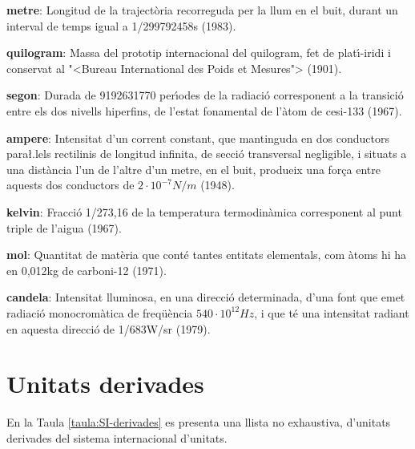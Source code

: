 \begin{list}{}
   {\setlength{\labelwidth}{22mm} \setlength{\leftmargin}{22mm} \setlength{\labelsep}{2mm}}
   \item[\textbf{metre}:] Longitud de la traject\`{o}ria recorreguda per la llum
   en el buit, durant un interval de temps igual a 1/299792458\unit{s} (1983).
   \item[\textbf{quilogram}:] Massa del prototip internacional del quilogram, fet de plat\'{\i}-iridi i
    conservat al {"<}Bureau International des Poids et Mesures{">} (1901).
   \item[\textbf{segon}:] Durada de 9192631770 per\'{\i}odes de la
   radiaci\'{o} corresponent a la transici\'{o} entre els dos nivells
  hiperfins, de l'estat fonamental de l'\`{a}tom de cesi-133 (1967).
   \item[\textbf{ampere}:] Intensitat d'un corrent constant,
   que mantinguda en dos conductors para{\l.l}els rectilinis de longitud
   infinita, de secci\'{o} transversal negligible, i situats a una
   dist\`{a}ncia l'un de l'altre d'un metre, en el buit, produeix una for\c{c}a entre
   aquests dos conductors de $2\cdot10^{-7}\unit{N/m}$ (1948).
   \item[\textbf{kelvin}:] Fracci\'{o} 1/273,16 de la temperatura
   termodin\`{a}mica corresponent al punt triple de l'aigua (1967).
   \item[\textbf{mol}:] Quantitat de mat\`{e}ria que cont\'{e} tantes
   entitats elementals, com \`{a}toms hi ha en 0,012\unit{kg} de carboni-12 (1971).
   \item[\textbf{candela}:] Intensitat lluminosa, en una direcci\'{o} determinada,
   d'una font que emet radiaci\'{o} monocrom\`{a}tica de freq\"{u}\`{e}ncia $540\cdot10^{12}\unit{Hz}$, i
   que t\'{e} una intensitat radiant en aquesta direcci\'{o} de 1/683\unit{W/sr} (1979).
\end{list}

\section{Unitats derivades}

En la Taula \vref{taula:SI-derivades} es presenta una llista no
exhaustiva, d'unitats derivades del sistema internacional d'unitats.

